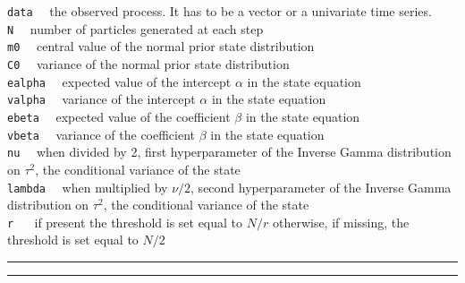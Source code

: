 \documentclass[
]{book}
\theoremstyle{break}
\theoremstyle{nonumberplain}
\begin{document}
\texttt{data} ~~the observed process. It has to be a vector or a
univariate time series.\\
\texttt{N} ~~number of particles generated at each step\\
\texttt{m0} ~~central value of the normal prior state distribution\\
\texttt{C0} ~~variance of the normal prior state distribution\\
\texttt{ealpha} ~~expected value of the intercept \(\alpha\) in the
state equation\\
\texttt{valpha} ~~variance of the intercept \(\alpha\) in the state
equation\\
\texttt{ebeta} ~~expected value of the coefficient \(\beta\) in the
state equation\\
\texttt{vbeta} ~~variance of the coefficient \(\beta\) in the state
equation\\
\texttt{nu} ~~when divided by 2, first hyperparameter of the Inverse
Gamma distribution on \(\tau^2\), the conditional variance of the
state\\
\texttt{lambda} ~~when multiplied by \(\nu/2\), second hyperparameter of
the Inverse Gamma distribution on \(\tau^2\), the conditional variance
of the state\\
\texttt{r} ~~ if present the threshold is set equal to \(N/r\)
otherwise, if missing, the threshold is set equal to \(N/2\)

\hrule
\hrule
\end{document}
